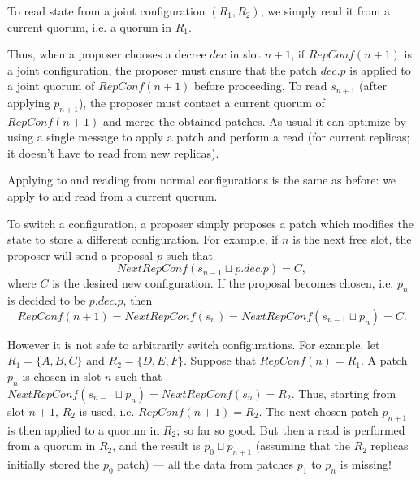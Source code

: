\documentclass[12pt,a4paper,en]{pracamgr}
\begin{document}
To read state from a joint configuration $(R_1, R_2)$, we simply read it from a current quorum, i.e. a quorum in $R_1$.

Thus, when a proposer chooses a decree $dec$ in slot $n + 1$, if $RepConf(n+1)$ is a joint configuration, the proposer must ensure that the patch $dec.p$ is applied to a joint quorum of $RepConf(n+1)$ before proceeding. To read $s_{n+1}$ (after applying $p_{n+1}$), the proposer must contact a current quorum of $RepConf(n+1)$ and merge the obtained patches. As usual it can optimize by using a single message to apply a patch and perform a read (for current replicas; it doesn't have to read from new replicas).

Applying to and reading from normal configurations is the same as before: we apply to and read from a current quorum.

To switch a configuration, a proposer simply proposes a patch which modifies the state to store a different configuration. For example, if $n$ is the next free slot, the proposer will send a proposal $p$ such that
$$ NextRepConf(s_{n-1} \sqcup p.dec.p) = C, $$
where $C$ is the desired new configuration. If the proposal becomes chosen, i.e. $p_n$ is decided to be $p.dec.p$, then
$$RepConf(n+1) = NextRepConf(s_n) = NextRepConf(s_{n-1} \sqcup p_n) = C.$$

However it is not safe to arbitrarily switch configurations. For example, let $R_1 = \{A, B, C\}$ and $R_2 = \{D, E, F\}$. Suppose that $RepConf(n) = R_1$. A patch $p_n$ is chosen in slot $n$ such that $NextRepConf(s_{n-1} \sqcup p_n) = NextRepConf(s_n) = R_2$. Thus, starting from slot $n+1$, $R_2$ is used, i.e. $RepConf(n+1) = R_2$. The next chosen patch $p_{n+1}$ is then applied to a quorum in $R_2$; so far so good. But then a read is performed from a quorum in $R_2$, and the result is $p_0 \sqcup p_{n+1}$ (assuming that the $R_2$ replicas initially stored the $p_0$ patch) --- all the data from patches $p_1$ to $p_n$ is missing!
\end{document}
